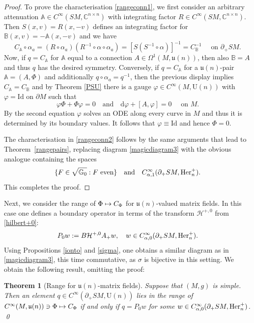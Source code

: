 \documentclass[JEP,XML,SOM,Unicode,published]{cedram}
\newcommand\mto{\mathchoice{\longmapsto}{\mapsto}{\mapsto}{\mapsto}}
\newcommand{\rU}{\mathrm{U}}
\theoremstyle{plain}
\newtheorem{theorem}{Theorem}[section]
\theoremstyle{definition}
\newcommand{\A}{\mathbb{A}}
\newcommand{\B}{\mathbb{B}}
\newcommand{\G}{\mathbb{G}}
\newcommand{\C}{\mathbb{C}}
\renewcommand{\H}{\mathcal{H}}
\renewcommand{\u}{\mathfrak{u}}
\renewcommand{\d}{\mathrm{d}}
\newcommand{\he}{\textup{Her}}
\newcommand{\Id}{\mathrm{Id}}
\newcommand{\1}{{\bf 1}}
\begin{document}
\begin{proof}
To prove the characterisation \eqref{rangeconn1}, we first consider an arbitrary attenuation $\A \in C^\infty(SM,\C^{n\times n})$ with integrating factor $R\in C^\infty(SM,\C^{n \times n})$. Then $S(x,v) = R(x,-v)$ defines an integrating factor for $\B(x,v)=-\A(x,-v)$ and we have
\begin{equation*}
C_\A\circ \alpha_a = (R\circ \alpha_a) (R^{-1}\circ\alpha\circ\alpha_a) = \left[S(S^{-1} \circ \alpha) \right]^{-1} = C_\B^{-1}\quad \text{ on } \partial_+SM.
\end{equation*}
Now, if $q=C_\A$ for $\A$ equal to a connection $A\in \Omega^1(M,\u(n))$, then also $\B=A$ and thus $q$ has the desired symmetry. Conversely, if $q=C_\A$ for a $\u(n)$-pair $\A=(A,\Phi)$ and additionally $q\circ\alpha_a = q^{-1}$, then the previous display implies $C_\A = C_\B$ and by Theorem \ref{PSU} there is a
gauge $\varphi \in C^\infty(M,\rU(n))$ with $\varphi=\Id$
on $\partial M$ such that
\begin{equation*}
\varphi \Phi + \Phi\varphi =0\quad \text{and} \quad \d \varphi + [A,\varphi] =0 \quad \text{ on } M.
\end{equation*}
By the second equation $\varphi$ solves an ODE along every curve in $M$ and thus it is determined by its boundary values. It follows that $\varphi \equiv \Id$ and hence $\Phi=0$.

The characterisation in \eqref{rangeconn2} follows by the same arguments that lead to Theorem~\ref{rangepairs}, replacing diagram \eqref{magicdiagram3} with the obvious analogue containing the spaces
\[
\{F\in\sqrt{\G_0}: F\text{ even}\}\quad\text{and}\quad C^\infty_{\alpha,1}(\partial_+SM,\he^+_n).
\]
This completes the proof.
\end{proof}

Next, we consider the range of $\Phi\mto C_\Phi$ for $\u(n)$-valued matrix fields. In this case one defines a boundary operator in terms of the transform
$\H^{+,0}$ from \eqref{hilbert+0}:
\begin{equation*}
P_0 w : = B\H^{+,0} A_+ w,\quad w\in C_{\alpha,0}^\infty(\partial_+SM,\he^+_n).
\end{equation*}
Using Propositions \ref{ionto} and \ref{sigma}, one obtains a similar diagram as in \eqref{magicdiagram3}, this time commutative, as $\sigma$ is bijective in this setting. We obtain the following result, omitting the proof:

\begin{theorem}[Range for $\u(n)$-matrix fields] \label{rangefields} Suppose that $(M,g)$ is simple. Then an element $q\in C^\infty(\partial_+SM,\rU(n))$ lies in the range of $C^\infty(M,\u(n))\ni \Phi \mto C_\Phi$ if and only if
$
q = P_0w$ for some $w\in C_{\alpha,0}^\infty(\partial_+SM,\he^+_n)$. \qed
\end{theorem}
\end{document}
